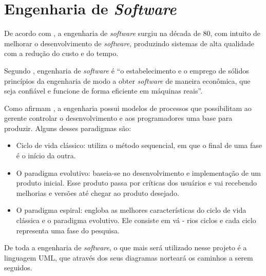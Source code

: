 \section{Engenharia de \textit{Software}}

	\par De acordo com , a engenharia de \textit{software}
surgiu na década de 80, com intuito de melhorar o desenvolvimento de
\textit{software}, produzindo sistemas de alta qualidade com a redução do custo
e do tempo.

	\par Segundo , engenharia de \textit{software} é
“o estabelecimento e o emprego de sólidos princípios da engenharia de modo a
obter \textit{software} de maneira econômica, que seja confiável e funcione de
forma eficiente em máquinas reais”.

	\par Como afirmam , a engenharia possui modelos de
processos que possibilitam ao gerente controlar o desenvolvimento e aos
programadores uma base para produzir. Alguns desses paradigmas são:

	\begin{itemize}
	  
	  \item Ciclo de vida clássico: utiliza o método sequencial, em que o final
	  de uma fase é o início da outra.
	  
	  \item O paradigma evolutivo: baseia-se no desenvolvimento e implementação
	  de um produto inicial. Esse produto passa por críticas dos usuários e vai
	  recebendo melhorias e versões até chegar ao produto desejado.
	  
	  \item O paradigma espiral: engloba as melhores características do ciclo de
	  vida clássica e o paradigma evolutivo. Ele consiste em vá - rios ciclos e
	  cada ciclo representa uma fase do pesquisa.
	
	\end{itemize}



	\par De toda a engenharia de \textit{software}, o que mais será utilizado nesse
projeto é a linguagem UML, que através dos seus diagramas norteará os caminhos
a serem seguidos.